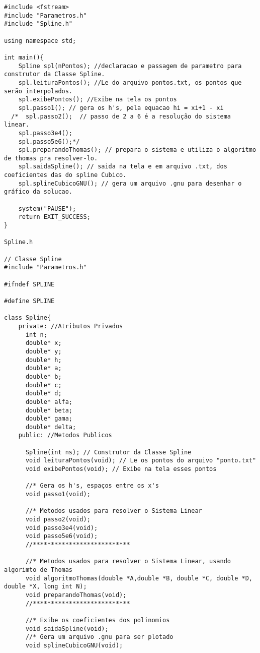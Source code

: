 \begin{verbatim}
#include <fstream>
#include "Parametros.h"
#include "Spline.h"

using namespace std;

int main(){
    Spline spl(nPontos); //declaracao e passagem de parametro para construtor da Classe Spline.
    spl.leituraPontos(); //Le do arquivo pontos.txt, os pontos que serão interpolados.
    spl.exibePontos(); //Exibe na tela os pontos
    spl.passo1(); // gera os h's, pela equacao hi = xi+1 - xi
  /*  spl.passo2();  // passo de 2 a 6 é a resolução do sistema linear.
    spl.passo3e4();
    spl.passo5e6();*/
    spl.preparandoThomas(); // prepara o sistema e utiliza o algoritmo de thomas pra resolver-lo.
    spl.saidaSpline(); // saida na tela e em arquivo .txt, dos coeficientes das do spline Cubico.
    spl.splineCubicoGNU(); // gera um arquivo .gnu para desenhar o gráfico da solucao. 
     
    system("PAUSE");
    return EXIT_SUCCESS;
}

Spline.h

// Classe Spline
#include "Parametros.h"

#ifndef SPLINE

#define SPLINE

class Spline{
    private: //Atributos Privados
      int n;
      double* x;
      double* y;
      double* h;
      double* a;
      double* b;
      double* c;
      double* d;    
      double* alfa;   
      double* beta;   
      double* gama;  
      double* delta;   
    public: //Metodos Publicos
    
      Spline(int ns); // Construtor da Classe Spline
      void leituraPontos(void); // Le os pontos do arquivo "ponto.txt"      
      void exibePontos(void); // Exibe na tela esses pontos
      
      //* Gera os h's, espaços entre os x's
      void passo1(void);
      
      //* Metodos usados para resolver o Sistema Linear
      void passo2(void);
      void passo3e4(void);
      void passo5e6(void);
      //***************************
      
      //* Metodos usados para resolver o Sistema Linear, usando algorimto de Thomas
      void algoritmoThomas(double *A,double *B, double *C, double *D, double *X, long int N);
      void preparandoThomas(void);
      //***************************
      
      //* Exibe os coeficientes dos polinomios
      void saidaSpline(void);
      //* Gera um arquivo .gnu para ser plotado
      void splineCubicoGNU(void);


\end{verbatim}
